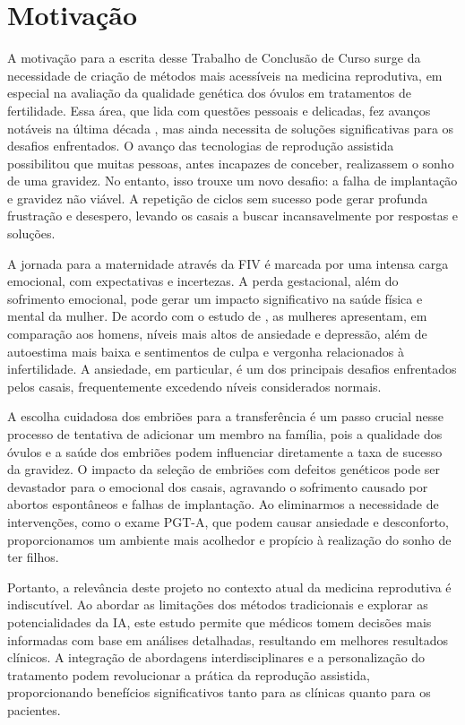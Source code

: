 \section{Motivação}

A motivação para a escrita desse Trabalho de Conclusão de Curso surge da necessidade de criação de métodos mais acessíveis na medicina reprodutiva, em especial na avaliação da qualidade genética dos óvulos em tratamentos de fertilidade. Essa área, que lida com questões pessoais e delicadas, fez avanços notáveis na última década \cite{pandit2022}, mas ainda necessita de soluções significativas para os desafios enfrentados. O avanço das tecnologias de reprodução assistida possibilitou que muitas pessoas, antes incapazes de conceber, realizassem o sonho de uma gravidez. No entanto, isso trouxe um novo desafio: a falha de implantação e gravidez não viável. A repetição de ciclos sem sucesso pode gerar profunda frustração e desespero, levando os casais a buscar incansavelmente por respostas e soluções.

A jornada para a maternidade através da FIV é marcada por uma intensa carga emocional, com expectativas e incertezas. A perda gestacional, além do sofrimento emocional, pode gerar um impacto significativo na saúde física e mental da mulher. De acordo com o estudo de \cite{montagnini2010}, as mulheres apresentam, em comparação aos homens, níveis mais altos de ansiedade e depressão, além de autoestima mais baixa e sentimentos de culpa e vergonha relacionados à infertilidade. A ansiedade, em particular, é um dos principais desafios enfrentados pelos casais, frequentemente excedendo níveis considerados normais.

A escolha cuidadosa dos embriões para a transferência é um passo crucial nesse processo de tentativa de adicionar um membro na família, pois a qualidade dos óvulos e a saúde dos embriões podem influenciar diretamente a taxa de sucesso da gravidez. O impacto da seleção de embriões com defeitos genéticos pode ser devastador para o emocional dos casais, agravando o sofrimento causado por abortos espontâneos e falhas de implantação. Ao eliminarmos a necessidade de intervenções, como o exame PGT-A, que podem causar ansiedade e desconforto, proporcionamos um ambiente mais acolhedor e propício à realização do sonho de ter filhos.

Portanto, a relevância deste projeto no contexto atual da medicina reprodutiva é indiscutível. Ao abordar as limitações dos métodos tradicionais e explorar as potencialidades da IA, este estudo permite que médicos tomem decisões mais informadas com base em análises detalhadas, resultando em melhores resultados clínicos. A integração de abordagens interdisciplinares e a personalização do tratamento podem revolucionar a prática da reprodução assistida, proporcionando benefícios significativos tanto para as clínicas quanto para os pacientes.


